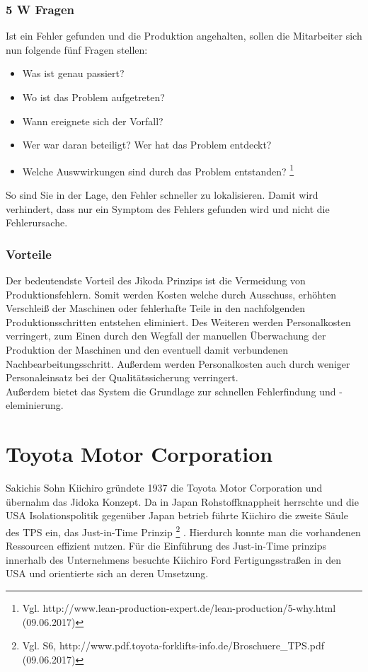 \documentclass[00_ToyotaProduktionssystem.tex]{subfiles}
\begin{document}
\subsubsection{5 W Fragen}
Ist ein Fehler gefunden und die Produktion angehalten, sollen die Mitarbeiter sich nun folgende fünf Fragen stellen:
\begin{itemize}
\item{Was ist genau passiert?}
\item{Wo ist das Problem aufgetreten?}
\item{Wann ereignete sich der Vorfall?}
\item{Wer war daran beteiligt? Wer hat das Problem entdeckt?}
\item{Welche Auswwirkungen sind durch das Problem entstanden?}
\footnote{Vgl.  http://www.lean-production-expert.de/lean-production/5-why.html (09.06.2017)}
\end{itemize}
So sind Sie in der Lage, den Fehler schneller zu lokalisieren. Damit wird verhindert, dass nur ein Symptom des Fehlers gefunden wird und nicht die Fehlerursache.


\subsubsection{Vorteile}
Der bedeutendste Vorteil des Jikoda Prinzips ist die Vermeidung von Produktionsfehlern. Somit werden Kosten   welche durch Ausschuss, erhöhten Verschleiß der Maschinen oder fehlerhafte Teile in den nachfolgenden Produktionsschritten entstehen eliminiert. Des Weiteren werden Personalkosten verringert, zum Einen durch den Wegfall der manuellen Überwachung der Produktion der Maschinen und den eventuell damit verbundenen Nachbearbeitungsschritt. Außerdem werden Personalkosten auch durch weniger Personaleinsatz bei der Qualitätssicherung verringert.\\
Außerdem bietet das System die Grundlage zur schnellen Fehlerfindung und -eleminierung.
\section{Toyota Motor Corporation}
Sakichis Sohn Kiichiro gründete 1937 die Toyota Motor Corporation und übernahm das Jidoka Konzept. Da in Japan Rohstoffknappheit herrschte und die USA Isolationspolitik gegenüber Japan betrieb führte Kiichiro die zweite Säule des TPS ein, das Just-in-Time Prinzip
\footnote{Vgl. S6,  http://www.pdf.toyota-forklifts-info.de/Broschuere\_TPS.pdf (09.06.2017)}
. Hierdurch konnte man die vorhandenen Ressourcen effizient nutzen. Für die Einführung des Just-in-Time prinzips innerhalb des Unternehmens besuchte Kiichiro Ford Fertigungsstraßen in den USA und orientierte sich an deren Umsetzung.
\end{document}
